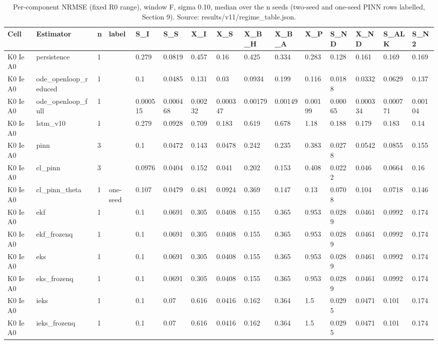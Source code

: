 \begin{table}[t]
\centering
\caption{Per-component NRMSE (fixed R0 range), window F, sigma 0.10, median over the n seeds (two-seed and one-seed PINN rows labelled, Section 9). Source: results/v11/regime\_table.json.}
\label{tab:si-components-F}
\footnotesize
\begin{tabular}{lllllllllllllll}
\toprule
Cell & Estimator & n & label & S\_I & S\_S & X\_I & X\_S & X\_B\_H & X\_B\_A & X\_P & S\_ND & X\_ND & S\_ALK & S\_N2 \\
\midrule
K0 Ie A0 & persistence & 1 &  & 0.279 & 0.0819 & 0.457 & 0.16 & 0.425 & 0.334 & 0.283 & 0.128 & 0.161 & 0.169 & 0.169 \\
K0 Ie A0 & ode\_openloop\_reduced & 1 &  & 0.1 & 0.0485 & 0.131 & 0.03 & 0.0934 & 0.199 & 0.116 & 0.0188 & 0.0332 & 0.0629 & 0.137 \\
K0 Ie A0 & ode\_openloop\_full & 1 &  & 0.000515 & 0.000468 & 0.00232 & 0.000347 & 0.00179 & 0.00149 & 0.00199 & 0.00065 & 0.000334 & 0.000771 & 0.00104 \\
K0 Ie A0 & lstm\_v10 & 1 &  & 0.279 & 0.0928 & 0.709 & 0.183 & 0.619 & 0.678 & 1.18 & 0.188 & 0.179 & 0.183 & 0.14 \\
K0 Ie A0 & pinn & 3 &  & 0.1 & 0.0472 & 0.143 & 0.0478 & 0.242 & 0.235 & 0.383 & 0.0278 & 0.0542 & 0.0855 & 0.155 \\
K0 Ie A0 & cl\_pinn & 3 &  & 0.0976 & 0.0404 & 0.152 & 0.041 & 0.202 & 0.153 & 0.408 & 0.0222 & 0.046 & 0.0664 & 0.16 \\
K0 Ie A0 & cl\_pinn\_theta & 1 & one-seed & 0.107 & 0.0479 & 0.481 & 0.0924 & 0.369 & 0.147 & 0.13 & 0.0708 & 0.104 & 0.0718 & 0.146 \\
K0 Ie A0 & ekf & 1 &  & 0.1 & 0.0691 & 0.305 & 0.0408 & 0.155 & 0.365 & 0.953 & 0.0289 & 0.0461 & 0.0992 & 0.174 \\
K0 Ie A0 & ekf\_frozenq & 1 &  & 0.1 & 0.0691 & 0.305 & 0.0408 & 0.155 & 0.365 & 0.953 & 0.0289 & 0.0461 & 0.0992 & 0.174 \\
K0 Ie A0 & eks & 1 &  & 0.1 & 0.0691 & 0.305 & 0.0408 & 0.155 & 0.365 & 0.953 & 0.0289 & 0.0461 & 0.0992 & 0.174 \\
K0 Ie A0 & eks\_frozenq & 1 &  & 0.1 & 0.0691 & 0.305 & 0.0408 & 0.155 & 0.365 & 0.953 & 0.0289 & 0.0461 & 0.0992 & 0.174 \\
K0 Ie A0 & ieks & 1 &  & 0.1 & 0.07 & 0.616 & 0.0416 & 0.162 & 0.364 & 1.5 & 0.0295 & 0.0471 & 0.101 & 0.174 \\
K0 Ie A0 & ieks\_frozenq & 1 &  & 0.1 & 0.07 & 0.616 & 0.0416 & 0.162 & 0.364 & 1.5 & 0.0295 & 0.0471 & 0.101 & 0.174 \\

\end{tabular}
\end{table}
